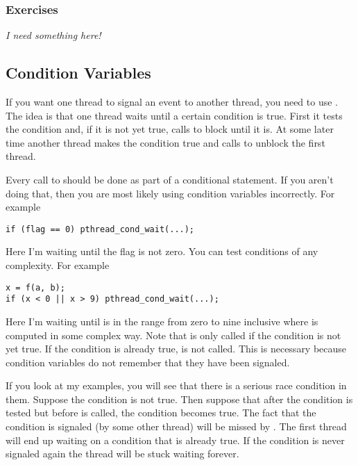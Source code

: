 \subsubsection*{Exercises}

\textit{I need something here!}

\subsection{Condition Variables}
\label{subsec:condition-vars}

If you want one thread to signal an event to another thread, you need to use . The idea is that one thread waits until a certain condition is true. First it
tests the condition and, if it is not yet true, calls  to block
until it is. At some later time another thread makes the condition true and calls
 to unblock the first thread.

Every call to  should be done as part of a conditional statement.
If you aren't doing that, then you are most likely using condition variables incorrectly. For
example

\begin{lstlisting}
if (flag == 0) pthread_cond_wait(...);
\end{lstlisting}

Here I'm waiting until the flag is not zero. You can test conditions of any complexity. For
example

\begin{lstlisting}
x = f(a, b);
if (x < 0 || x > 9) pthread_cond_wait(...);
\end{lstlisting}

Here I'm waiting until  is in the range from zero to nine inclusive where 
is computed in some complex way. Note that  is only called if the
condition is not yet true. If the condition is already true,  is
not called. This is necessary because condition variables do not remember that they have been
signaled.

If you look at my examples, you will see that there is a serious race condition in them. Suppose
the condition is not true. Then suppose that after the condition is tested but before
 is called, the condition becomes true. The fact that the
condition is signaled (by some other thread) will be missed by .
The first thread will end up waiting on a condition that is already true. If the condition is
never signaled again the thread will be stuck waiting forever.

